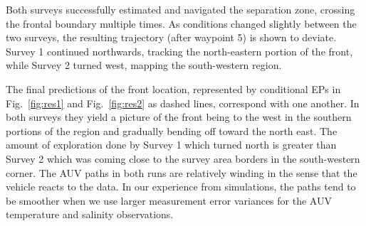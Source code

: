 \documentclass[aoas]{imsart}
\begin{document}
Both surveys successfully estimated and navigated the separation zone,
crossing the frontal boundary multiple times. As conditions changed
slightly between the two surveys, the resulting trajectory (after
waypoint 5) is shown to deviate. Survey 1 continued northwards,
tracking the north-eastern portion of the front, while Survey 2 turned
west, mapping the south-western region.

The final predictions of the front location, represented by
conditional EPs in Fig.~\ref{fig:res1} and Fig.~\ref{fig:res2} as
dashed lines, correspond with one another. In both surveys they yield
a picture of the front being to the west in the southern portions of
the region and gradually bending off toward the north east. The amount
of exploration done by Survey 1 which turned north is greater than
Survey 2 which was coming close to the survey area borders in the
south-western corner. The AUV paths in both runs are relatively
winding in the sense that the vehicle reacts to the data. In our
experience from simulations, the paths tend to be smoother when we
use larger measurement error variances for the AUV temperature and salinity observations. 
\end{document}
